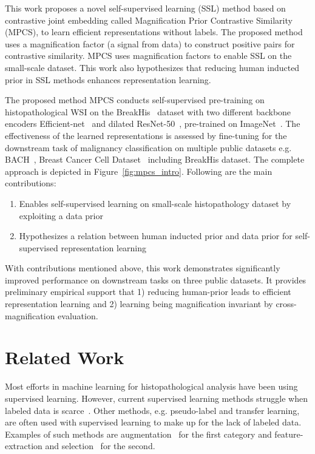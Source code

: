 \documentclass[conference]{IEEEtran}
\begin{document}
This work proposes a novel self-supervised learning (SSL) method based on contrastive joint embedding called Magnification Prior Contrastive Similarity (MPCS), to learn efficient representations without labels.
The proposed method uses a magnification factor (a signal from data) to construct positive pairs for contrastive similarity.
MPCS uses magnification factors to enable SSL on the small-scale dataset. This work also hypothesizes that reducing human inducted prior in SSL methods enhances representation learning. 



The proposed method MPCS conducts self-supervised pre-training on histopathological WSI on the BreakHis~\cite{spanhol2016dataset} dataset with two different backbone encoders Efficient-net~\cite{tan2019efficientnet} and dilated ResNet-50~\cite{yu2017dilated}, pre-trained on ImageNet~\cite{deng2009imagenet}.
The effectiveness of the learned representations is assessed by fine-tuning for the downstream task of malignancy classification on multiple public datasets e.g. BACH~\cite{aresta2019bach}, Breast Cancer Cell Dataset~\cite{gelasca2008evaluation} including BreakHis dataset.
The complete approach is depicted in Figure~\ref{fig:mpcs_intro}.
Following are the main contributions: 
\begin{enumerate}
\item Enables self-supervised learning on small-scale histopathology dataset by exploiting a data prior
\item Hypothesizes a relation between human inducted prior and data prior for self-supervised representation learning
\end{enumerate}
With contributions mentioned above, this work demonstrates significantly improved performance on downstream tasks on three public datasets. It provides preliminary empirical support that 1) reducing human-prior leads to efficient representation learning and 2) learning being magnification invariant by cross-magnification evaluation. 


\section{Related Work} \label{related_work}
Most efforts in machine learning for histopathological analysis have been using supervised learning.
However, current supervised learning methods struggle when labeled data is scarce~\cite{komura2018machine}.
Other methods, e.g. pseudo-label and transfer learning, are often used with supervised learning to make up for the lack of labeled data.
Examples of such methods are augmentation~\cite{lin2018scannet} for the first category and feature-extraction and selection~\cite{spanhol2017deep, wang2020breast} for the second.
\end{document}
